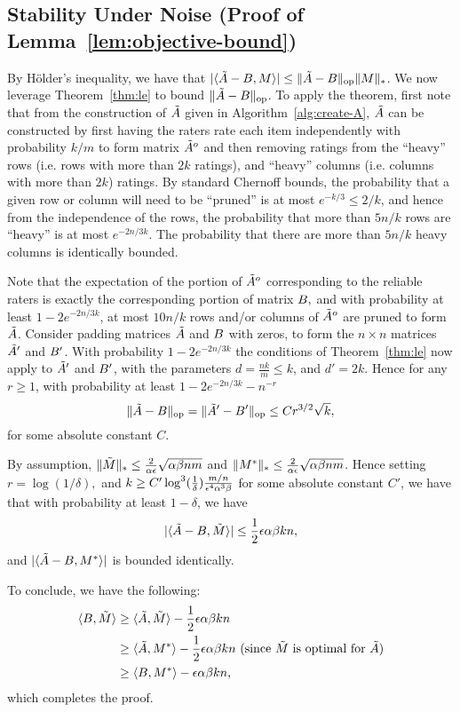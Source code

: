 \subsection{Stability Under Noise (Proof of Lemma~\ref{lem:objective-bound})}
\label{sec:objective-bound-proof}

By H\"{o}lder's inequality, we have that $|\langle \tilde{A}-B, M \rangle| \leq \|\tilde{A}-B\|_{\mathrm{op}}\|M\|_*$.   We now leverage Theorem~\ref{thm:le} to bound $\|\tilde{A}-B\|_{\mathrm{op}}$.  To apply the theorem, first note that from the construction of $\tilde{A}$ given in Algorithm~\ref{alg:create-A}, $\tilde{A}$ can be constructed by first having the raters rate each item independently with probability $k/m$ to form matrix $\tilde{A}^o$ and then removing ratings from the ``heavy'' rows (i.e. rows with more than $2k$ ratings), and ``heavy'' columns (i.e. columns with more than $2k$) ratings.  By standard Chernoff bounds, the probability that a given row or column will need to be ``pruned'' is at most $e^{-k/3} \le 2/k$, and hence from the independence of the rows, the probability that more than $5n/k$ rows are ``heavy'' is at most $e^{-2n/3k}$.  The probability that there are more than $5n/k$ heavy columns is identically bounded.

 Note that the expectation of the portion of $\tilde{A}^o$ corresponding to the reliable raters is exactly the corresponding portion of matrix $B,$ and with probability at least $1-2e^{-2n/3k}$, at most $10 n/k$ rows and/or columns of $\tilde{A}^o$ are pruned to form $\tilde{A}$.  Consider padding matrices $\tilde{A}$ and $B$ with zeros, to form the $n \times n$ matrices $\tilde{A}'$ and $B'$.   With probability $1-2e^{-2n/3k}$ the conditions of Theorem~\ref{thm:le} now apply to $\tilde{A}'$ and $B'$, with the parameters $d = \frac{n k}{m} \le k$, and $d' =  2k$.  Hence for any $r \ge 1$, with probability at least $1-2e^{-2n/3k} -n^{-r}$ $$\|\tilde{A}-B\|_{\mathrm{op}} = \|\tilde{A}'-B'\|_{\mathrm{op}} \le C r^{3/2} \sqrt{k},$$ for some absolute constant $C$.  

By assumption, $\|\tilde{M}\|_* \le \frac{2}{\alpha \epsilon}\sqrt{\alpha \beta n m}$ and $\|M^*\|_* \le \frac{2}{\alpha \epsilon}\sqrt{\alpha \beta n m}$.   Hence setting $r= \log (1/\delta),$ and $k \ge C' \log^3(\frac{1}{\delta}) \frac{m/n}{\epsilon^4 \alpha^3 \beta}$ for some absolute constant $C'$, we have that with probability at least $1-\delta$, we have $$|\langle \tilde{A}-B, \tilde{M} \rangle|  \le \frac{1}{2} \epsilon \alpha \beta k n,$$ and $|\langle \tilde{A}-B, M^* \rangle|$ is bounded identically.

To conclude, we have the following:
\begin{align}
\langle B, \tilde{M} \rangle  &\geq \langle \tilde{A}, \tilde{M} \rangle - \frac{1}{2}\epsilon \alpha \beta k n \\
 &\geq \langle \tilde{A}, M^* \rangle - \frac{1}{2} \epsilon \alpha \beta k n \text{ (since $\tilde{M}$ is optimal for $\tilde{A}$)} \\
 &\geq \langle B, M^* \rangle - \epsilon \alpha \beta k n,
\end{align}
which completes the proof.


